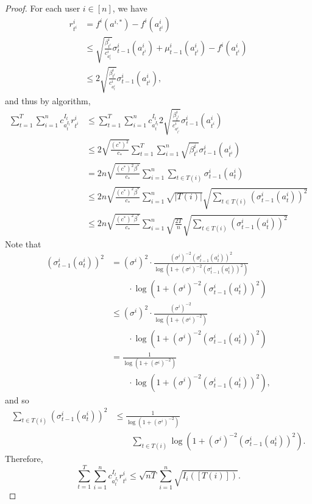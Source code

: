 \documentclass[letterpaper]{vldb}
\begin{document}
\begin{proof}
  For each user $i\in [n]$, we have
  \begin{align*}
    r^i_{t^i} & = f^i(a^{i,\ast}) - f^i(a^i_{t^i})\\
    & \le \sqrt{\frac{\beta^i_{t^i}}{c^i_{a^i_{t}}}}\sigma^i_{t-1}(a^i_{t^i}) +\mu^i_{t-1}(a^i_{t^i}) - f^i(a^i_{t^i})\\
    & \le 2
    \sqrt{\frac{\beta^i_{t^i}}{c^i_{a^i_{t}}}}\sigma^i_{t-1}(a^i_{t^i}),
  \end{align*}
   and thus by algorithm,
  \begin{align*}
    \sum_{t=1}^T \sum_{i=1}^n c^{I_t}_{a^{I_t}_t} r^i_{t^i}
    & \le \sum_{t=1}                                                    ^T \sum_{i=1}^n c^{I_t}_{a^{I_t}_t} 2 \sqrt{\frac{\beta^i_{t^i}}{c^i_{a^i_{t^i}}}}\sigma^i_{t-1}(a^i_{t^i})\\
        & \le 2 \sqrt{\frac{(c^\ast)^2}{c_\ast}} \sum_{t=1}^T \sum_{i=1}^n \sqrt{\beta^i_{t^i}}\sigma^i_{t-1}(a^i_{t^i})\\
    & = 2 n \sqrt{\frac{(c^\ast)^2\beta^\ast}{c_\ast}}\sum_{i=1}^n\sum_{t\in T(i)} \sigma^i_{t-1}(a^i_{t})\\
    & \le 2 n \sqrt{\frac{(c^\ast)^2\beta^\ast}{c_\ast}}\sum_{i=1}^n\sqrt{|T(i)|}\sqrt{\sum_{t\in T(i)} (\sigma^i_{t-1}(a^i_{t}))^2}\\
    & \le 2 n \sqrt{\frac{(c^\ast)^2\beta^\ast}{c_\ast}}\sum_{i=1}^n\sqrt{\frac{2T}{n}}\sqrt{\sum_{t\in T(i)} (\sigma^i_{t-1}(a^i_{t}))^2}
  \end{align*}
  Note that
\begin{align*}
    (\sigma^i_{t-1}(a^i_{t}))^2
    & = (\sigma^i)^2\cdot \frac{(\sigma^i)^{-2} (\sigma^i_{t-1}(a^i_{t}))^2}{\log\left(1 + (\sigma^i)^{-2} (\sigma^i_{t-1}(a^i_{t}))^2\right)}\\
    &\qquad \cdot \log\left(1 + (\sigma^i)^{-2} (\sigma^i_{t-1}(a^i_{t}))^2\right)\\
    & \le (\sigma^i)^2 \cdot \frac{(\sigma^i)^{-2}}{\log\left(1 + (\sigma^i)^{-2}\right)}\\
    &\qquad \cdot \log\left(1 + (\sigma^i)^{-2} (\sigma^i_{t-1}(a^i_{t}))^2\right)\\
    & = \frac{1}{\log\left(1 + (\sigma^i)^{-2}\right)}\\   
    &\qquad \cdot \log\left(1 + (\sigma^i)^{-2} (\sigma^i_{t-1}(a^i_{t}))^2\right),
  \end{align*}
  and so
  \begin{align*}
      \sum_{t\in T(i)} (\sigma^i_{t-1}(a^i_{t}))^2
      & \le \frac{1}{\log\left(1 + (\sigma^i)^{-2}\right)}\\
    &\qquad \sum_{t\in T(i)} \log\left(1 + (\sigma^i)^{-2} (\sigma^i_{t-1}(a^i_{t}))^2\right).
  \end{align*}
  Therefore,
  \[
    \sum_{t=1}^T \sum_{i=1}^n c^{I_t}_{a^{I_t}_t} r^i_{t^i} \le \sqrt{n T}\sum_{i=1}^n \sqrt{I_i([T(i)])}.
  \]
\end{proof}
\end{document}
